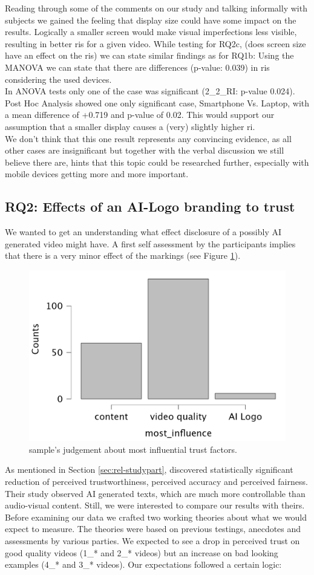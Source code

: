 \documentclass[
  a4paper,  %
  twoside,  %
  bibliography=totoc,
  headsepline,
  cleardoublepage=empty,
  parskip=half,
  draft=false
]{scrbook}
\begin{document}
Reading through some of the comments on our study and talking informally with subjects we gained the feeling that display size could have some impact on the results. Logically a smaller screen would make visual imperfections less visible, resulting in better \gls{ri}s for a given video. While testing for RQ2c, (does screen size have an effect on the \gls{ri}s) we can state similar findings as for RQ1b: Using the MANOVA we can state that there are differences (p-value: 0.039) in \gls{ri}s considering the used devices. \\
In ANOVA tests only one of the case was significant (2\_2\_RI: p-value 0.024). Post Hoc Analysis showed one only significant case, Smartphone Vs. Laptop, with a mean difference of +0.719 and p-value of 0.02. This would support our assumption that a smaller display causes a (very) slightly higher \gls{ri}. \\
We don't think that this one result represents any convincing evidence, as all other cases are insignificant but together with the verbal discussion we still believe there are, hints that this topic could be researched further, especially with mobile devices getting more and more important.


\subsection{RQ2: Effects of an AI-Logo branding to trust}
\label{subsec:RQ2}
We wanted to get an understanding what effect disclosure of a possibly AI generated video might have. A first self assessment by the participants implies that there is a very minor effect of the markings (see Figure \ref{fig:most-influence}).
\begin{figure}[h]
  \centering
  \includegraphics[width=.5\textwidth]{graphics/images/statistics/most-influence.png}
  \caption{sample's judgement about most influential trust factors.}
  \label{fig:most-influence}
\end{figure}
As mentioned in Section \ref{sec:rel-studypart},  discovered statistically significant reduction of perceived trustworthiness, perceived accuracy and perceived fairness. Their study observed AI generated texts, which are much more controllable than audio-visual content. Still, we were interested to compare our results with theirs. \\
Before examining our data we crafted two working theories about what we would expect to measure. The theories were based on previous testings, anecdotes and assessments by various parties. We expected to see a drop in perceived trust on good quality videos (1\_* and 2\_* videos) but an increase on bad looking examples (4\_* and 3\_* videos). Our expectations followed a certain logic:
\end{document}

